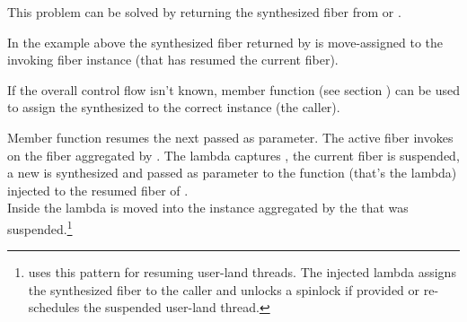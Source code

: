 This problem can be solved by returning the synthesized fiber from  \resume or
\resumewith. 

In the example above the synthesized fiber returned by \resume is
move-assigned to the invoking fiber instance (that has resumed the current
fiber).\\

\xspace\newline

If the overall control flow isn't known, member function \resumewith (see section
) can be used to assign the synthesized \fiber to the correct \fiber
instance (the caller).

Member function  resumes the next  passed as
parameter. The active fiber invokes \resumewith on the fiber aggregated by
. The lambda captures , the current fiber is suspended, a
new \fiber is synthesized and passed as parameter  to the function
(that's the lambda) injected to the resumed fiber of .\\
Inside the lambda  is moved into the instance  aggregated by the
 that was suspended.\footnote{\bfiber\cite{bfiber} uses this 
pattern for resuming user-land threads.
The injected lambda assigns the synthesized fiber to the caller and unlocks a
spinlock if provided or re-schedules the suspended user-land thread.}

